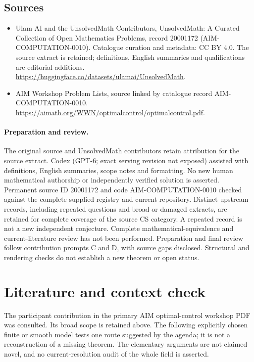 \documentclass[11pt]{article}
\begin{document}
\subsection{Sources}
\begin{itemize}
\item[S1] Ulam AI and the UnsolvedMath Contributors, UnsolvedMath: A Curated Collection of Open Mathematics Problems, record 20001172 (AIM-COMPUTATION-0010). Catalogue curation and metadata: CC BY 4.0. The source extract is retained; definitions, English summaries and qualifications are editorial additions.
\url{https://huggingface.co/datasets/ulamai/UnsolvedMath}.
\item[S2] AIM Workshop Problem Lists, source linked by catalogue record AIM-COMPUTATION-0010.
\url{https://aimath.org/WWN/optimalcontrol/optimalcontrol.pdf}.
\end{itemize}
\paragraph{Preparation and review.}
The original source and UnsolvedMath contributors retain attribution for the source extract. Codex (GPT-6; exact serving revision not exposed) assisted with definitions, English summaries, scope notes and formatting. No new human mathematical authorship or independently verified solution is asserted. Permanent source ID 20001172 and code AIM-COMPUTATION-0010 checked against the complete supplied registry and current repository. Distinct upstream records, including repeated questions and broad or damaged extracts, are retained for complete coverage of the source CS category. A repeated record is not a new independent conjecture. Complete mathematical-equivalence and current-literature review has not been performed. Preparation and final review follow contribution prompts C and D, with source gaps disclosed. Structural and rendering checks do not establish a new theorem or open status.
\label{end:20001172}

\section{Literature and context check}
The participant contribution in the primary AIM optimal-control workshop
 PDF was consulted. Its broad scope is retained above. The following explicitly
 chosen finite or smooth model tests one route suggested by the agenda; it is
 not a reconstruction of a missing theorem. The elementary arguments are not
 claimed novel, and no current-resolution audit of the whole field is asserted.
\end{document}
